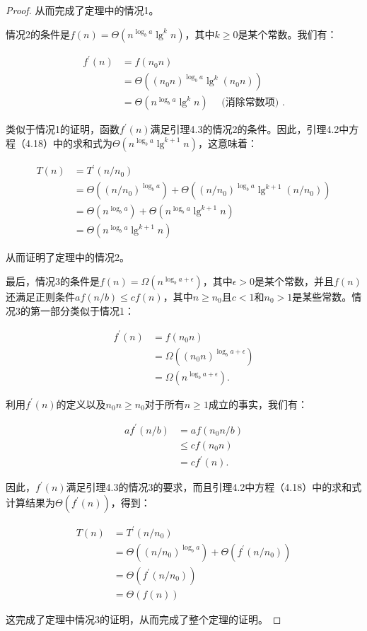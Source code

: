 \documentclass[lang=cn,newtx,10pt,scheme=chinese]{elegantbook}
\begin{document}
\begin{proof}
从而完成了定理中的情况1。

情况2的条件是$f(n)=\Theta(n^{\log _b a} \lg ^k n)$，其中$k \geq 0$是某个常数。我们有：

$$
\begin{aligned}
f^{\prime}(n) & =f(n_0 n) \\
& =\Theta((n_0 n)^{\log _b a} \lg ^k(n_0 n)) \\
& =\Theta(n^{\log _b a} \lg ^k n) \quad \text { (消除常数项) } .
\end{aligned}
$$

类似于情况1的证明，函数$f^{\prime}(n)$满足引理4.3的情况2的条件。因此，引理4.2中方程（4.18）中的求和式为$\Theta(n^{\log _b a} \lg ^{k+1} n)$，这意味着：

$$
\begin{aligned}
T(n) & =T^{\prime}(n / n_0) \\
& =\Theta((n / n_0)^{\log _b a})+\Theta((n / n_0)^{\log _b a} \lg ^{k+1}(n / n_0)) \\
& =\Theta(n^{\log _b a})+\Theta(n^{\log _b a} \lg ^{k+1} n) \\
& =\Theta(n^{\log _b a} \lg ^{k+1} n)
\end{aligned}
$$

从而证明了定理中的情况2。

最后，情况3的条件是$f(n)=\Omega(n^{\log _b a+\epsilon})$，其中$\epsilon>0$是某个常数，并且$f(n)$还满足正则条件$a f(n / b) \leq c f(n)$，其中$n \geq n_0$且$c<1$和$n_0>1$是某些常数。情况3的第一部分类似于情况1：

$$
\begin{aligned}
f^{\prime}(n) & =f(n_0 n) \\
& =\Omega((n_0 n)^{\log _b a+\epsilon}) \\
& =\Omega(n^{\log _b a+\epsilon}) .
\end{aligned}
$$

利用$f^{\prime}(n)$的定义以及$n_0 n \geq n_0$对于所有$n \geq 1$成立的事实，我们有：

$$
\begin{aligned}
a f^{\prime}(n / b) & =a f(n_0 n / b) \\
& \leq c f(n_0 n) \\
& =c f^{\prime}(n) .
\end{aligned}
$$

因此，$f^{\prime}(n)$满足引理4.3的情况3的要求，而且引理4.2中方程（4.18）中的求和式计算结果为$\Theta(f^{\prime}(n))$，得到：

$$
\begin{aligned}
T(n) & =T^{\prime}(n / n_0) \\
& =\Theta((n / n_0)^{\log _b a})+\Theta(f^{\prime}(n / n_0)) \\
& =\Theta(f^{\prime}(n / n_0)) \\
& =\Theta(f(n))
\end{aligned}
$$

这完成了定理中情况3的证明，从而完成了整个定理的证明。
\end{proof}
\end{document}
